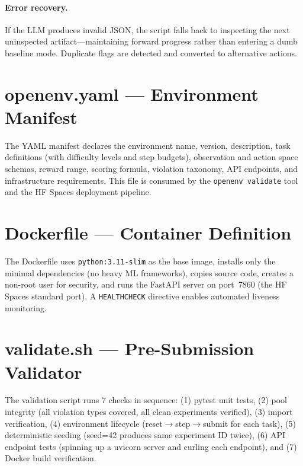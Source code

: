 \documentclass{article}
\begin{document}
\paragraph{Error recovery.}
If the LLM produces invalid JSON, the script falls back to inspecting
the next uninspected artifact---maintaining forward progress rather than
entering a dumb baseline mode.  Duplicate flags are detected and
converted to alternative actions.

\section{openenv.yaml --- Environment Manifest}

The YAML manifest declares the environment name, version, description,
task definitions (with difficulty levels and step budgets), observation
and action space schemas, reward range, scoring formula, violation
taxonomy, API endpoints, and infrastructure requirements.  This file
is consumed by the \texttt{openenv validate} tool and the HF Spaces
deployment pipeline.

\section{Dockerfile --- Container Definition}

The Dockerfile uses \texttt{python:3.11-slim} as the base image, installs
only the minimal dependencies (no heavy ML frameworks), copies source code,
creates a non-root user for security, and runs the FastAPI server on
port~7860 (the HF Spaces standard port).  A \texttt{HEALTHCHECK} directive
enables automated liveness monitoring.

\section{validate.sh --- Pre-Submission Validator}

The validation script runs 7 checks in sequence:
(1) pytest unit tests,
(2) pool integrity (all violation types covered, all clean experiments
    verified),
(3) import verification,
(4) environment lifecycle (reset$\to$step$\to$submit for each task),
(5) deterministic seeding (seed=42 produces same experiment ID twice),
(6) API endpoint tests (spinning up a uvicorn server and curling each
    endpoint), and
(7) Docker build verification.
\end{document}
